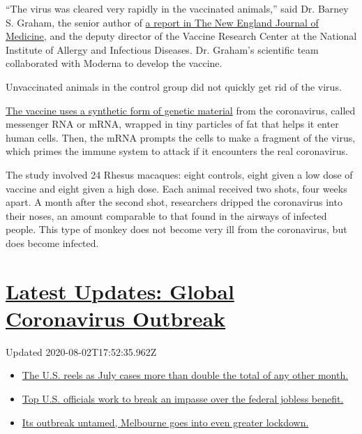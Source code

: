 ``The virus was cleared very rapidly in the vaccinated animals,'' said
Dr. Barney S. Graham, the senior author of
\href{https://www.nejm.org/doi/full/10.1056/NEJMoa2024671?query=RP}{a
report in The New England Journal of Medicine,} and the deputy director
of the Vaccine Research Center at the National Institute of Allergy and
Infectious Diseases. Dr. Graham's scientific team collaborated with
Moderna to develop the vaccine.

Unvaccinated animals in the control group did not quickly get rid of the
virus.

\href{https://www.nytimes.com/interactive/2020/science/coronavirus-vaccine-tracker.html}{The
vaccine uses a synthetic form of genetic material} from the coronavirus,
called messenger RNA or mRNA, wrapped in tiny particles of fat that
helps it enter human cells. Then, the mRNA prompts the cells to make a
fragment of the virus, which primes the immune system to attack if it
encounters the real coronavirus.

The study involved 24 Rhesus macaques: eight controls, eight given a low
dose of vaccine and eight given a high dose. Each animal received two
shots, four weeks apart. A month after the second shot, researchers
dripped the coronavirus into their noses, an amount comparable to that
found in the airways of infected people. This type of monkey does not
become very ill from the coronavirus, but does become infected.

\hypertarget{latest-updates-global-coronavirus-outbreak}{%
\section{\texorpdfstring{\href{https://www.nytimes.com/2020/08/01/world/coronavirus-covid-19.html?action=click\&pgtype=Article\&state=default\&region=MAIN_CONTENT_1\&context=storylines_live_updates}{Latest
Updates: Global Coronavirus
Outbreak}}{Latest Updates: Global Coronavirus Outbreak}}\label{latest-updates-global-coronavirus-outbreak}}

Updated 2020-08-02T17:52:35.962Z

\begin{itemize}
\tightlist
\item
  \href{https://www.nytimes.com/2020/08/01/world/coronavirus-covid-19.html?action=click\&pgtype=Article\&state=default\&region=MAIN_CONTENT_1\&context=storylines_live_updates\#link-34047410}{The
  U.S. reels as July cases more than double the total of any other
  month.}
\item
  \href{https://www.nytimes.com/2020/08/01/world/coronavirus-covid-19.html?action=click\&pgtype=Article\&state=default\&region=MAIN_CONTENT_1\&context=storylines_live_updates\#link-780ec966}{Top
  U.S. officials work to break an impasse over the federal jobless
  benefit.}
\item
  \href{https://www.nytimes.com/2020/08/01/world/coronavirus-covid-19.html?action=click\&pgtype=Article\&state=default\&region=MAIN_CONTENT_1\&context=storylines_live_updates\#link-2bc8948}{Its
  outbreak untamed, Melbourne goes into even greater lockdown.}
\end{itemize}

